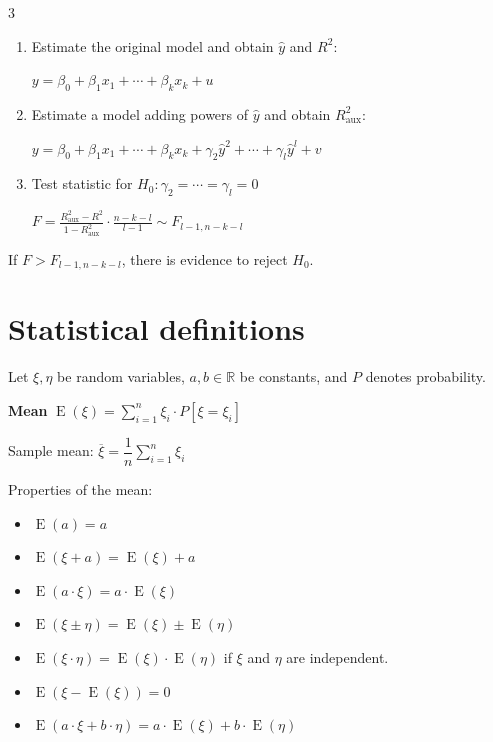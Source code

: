 \documentclass[10pt, a4paper, landscape]{article}
\DeclareMathOperator{\E}{E}
\begin{document}
\begin{multicols}{3}
\begin{enumerate}[leftmargin=*]
	\item Estimate the original model and obtain \( \hat{y} \) and \( R^{2} \):
	\begin{center}
		\( y = \beta_{0} + \beta_{1} x_{1} + \cdots + \beta_{k} x_{k} + u \)
	\end{center}
	\item Estimate a model adding powers of \( \hat{y} \) and obtain \( R_{\text{aux}}^{2} \):
	\begin{center}
		\( y = \beta_{0} + \beta_{1} x_{1} + \cdots + \beta_{k} x_{k} + \gamma_{2} \hat{y}^{2} + \cdots + \gamma_{l} \hat{y}^{l} + v \)
	\end{center}
	\item Test statistic for \( H_{0}: \gamma_{2} = \cdots = \gamma_{l} = 0 \)
	\begin{center}
		\( F = \frac{R_{\text{aux}}^{2} - R^{2}}{1 - R_{\text{aux}}^{2}} \cdot \frac{n - k - l}{l - 1} \sim F_{l - 1, n - k - l} \)
	\end{center}
\end{enumerate}

If \( F > F_{l - 1, n - k - l} \), there is evidence to reject \( H_{0} \).

\section*{Statistical definitions}

Let \( \xi, \eta \) be random variables, \( a, b \in \mathbb{R} \) be constants, and \( P \) denotes probability.

\textbf{Mean} \quad \( \E(\xi) = \sum_{i = 1}^{n} \xi_{i} \cdot P[\xi = \xi_{i}] \)

Sample mean: \quad \( \overline{\xi} = \dfrac{1}{n} \sum_{i = 1}^{n} \xi_{i} \)

Properties of the mean:

\begin{itemize}[leftmargin=*]
	\item \( \E(a) = a \)
	\item \( \E(\xi + a) = \E(\xi) + a \)
	\item \( \E(a \cdot \xi) = a \cdot \E(\xi) \)
	\item \( \E(\xi \pm \eta) = \E(\xi) \pm \E(\eta) \)
	\item \( \E(\xi \cdot \eta) = \E(\xi) \cdot \E(\eta) \) \quad if \( \xi \) and \( \eta \) are independent.
	\item \( \E(\xi - \E(\xi)) = 0 \)
	\item \( \E(a \cdot \xi + b \cdot \eta) = a \cdot \E(\xi) + b \cdot \E(\eta) \)
\end{itemize}


\end{multicols}
\end{document}
